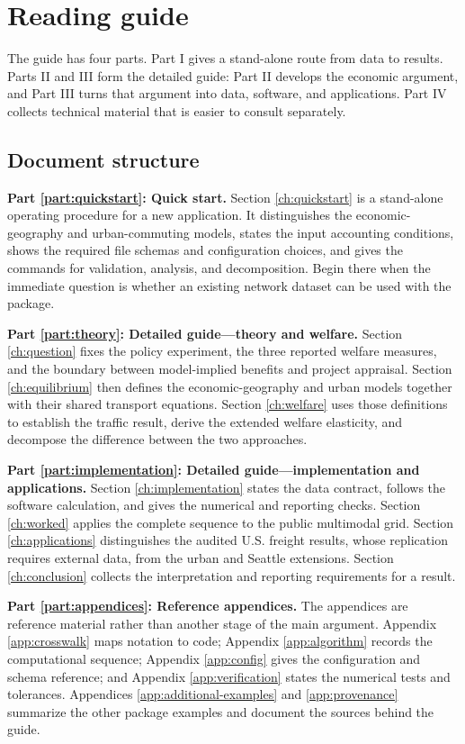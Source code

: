 \section*{Reading guide}

The guide has four parts. Part I gives a stand-alone route from data to
results. Parts II and III form the detailed guide: Part II develops the
economic argument, and Part III turns that argument into data, software, and
applications. Part IV collects technical material that is easier to consult
separately.

\subsection*{Document structure}

\textbf{Part \ref{part:quickstart}: Quick start.}
Section \ref{ch:quickstart} is a stand-alone operating procedure for a new
application. It distinguishes the economic-geography and urban-commuting
models, states the input accounting conditions, shows the required file
schemas and configuration choices, and gives the commands for validation,
analysis, and decomposition. Begin there when the immediate question is whether
an existing network dataset can be used with the package.

\textbf{Part \ref{part:theory}: Detailed guide---theory and welfare.}
Section \ref{ch:question} fixes the policy experiment, the three reported
welfare measures, and the boundary between model-implied benefits and project
appraisal. Section \ref{ch:equilibrium} then defines the economic-geography and
urban models together with their shared transport equations. Section
\ref{ch:welfare} uses those definitions to establish the traffic result,
derive the extended welfare elasticity, and decompose the difference between
the two approaches.

\textbf{Part \ref{part:implementation}: Detailed guide---implementation and
applications.}
Section \ref{ch:implementation} states the data contract, follows the software
calculation, and gives the numerical and reporting checks. Section
\ref{ch:worked} applies the complete sequence to the public multimodal grid.
Section \ref{ch:applications} distinguishes the audited U.S. freight results,
whose replication requires external data, from the urban and Seattle
extensions. Section \ref{ch:conclusion} collects the interpretation and
reporting requirements for a result.

\textbf{Part \ref{part:appendices}: Reference appendices.}
The appendices are reference material rather than another stage of the main
argument. Appendix \ref{app:crosswalk} maps notation to code; Appendix
\ref{app:algorithm} records the computational sequence; Appendix
\ref{app:config} gives the configuration and schema reference; and Appendix
\ref{app:verification} states the numerical tests and tolerances. Appendices
\ref{app:additional-examples} and \ref{app:provenance} summarize the other
package examples and document the sources behind the guide.

